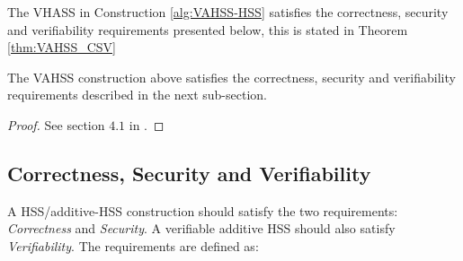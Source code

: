The VHASS in Construction \ref{alg:VAHSS-HSS} satisfies the correctness, security and verifiability requirements presented below, this is stated in Theorem \ref{thm:VAHSS_CSV} 
\\
\begin{thm}
\label{thm:VAHSS_CSV}
The VAHSS construction above satisfies the correctness, security and verifiability requirements described in the next sub-section. 
\end{thm}
\begin{proof}
See section $4.1$ in \cite{VAHSS}.
\end{proof}


\subsection*{Correctness, Security and Verifiability}
A HSS/additive-HSS construction should satisfy the two requirements: \textit{Correctness} and \textit{Security}. A verifiable additive HSS should also satisfy \textit{Verifiability}. The requirements are defined as:
